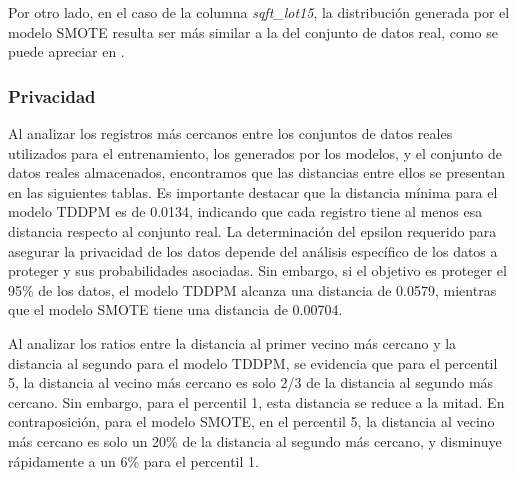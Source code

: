 

\newpage
Por otro lado, en el caso de la columna \emph{sqft\_lot15}, la distribución generada por el modelo SMOTE resulta ser más similar a la del conjunto de datos real, como se puede apreciar en .




\newpage
\subsubsection{Privacidad}
Al analizar los registros más cercanos entre los conjuntos de datos reales utilizados para el entrenamiento, los generados por los modelos, y el conjunto de datos reales almacenados, encontramos que las distancias entre ellos se presentan en las siguientes tablas. Es importante destacar que la distancia mínima para el modelo TDDPM es de 0.0134, indicando que cada registro tiene al menos esa distancia respecto al conjunto real. La determinación del epsilon requerido para asegurar la privacidad de los datos depende del análisis específico de los datos a proteger y sus probabilidades asociadas. Sin embargo, si el objetivo es proteger el 95\% de los datos, el modelo TDDPM alcanza una distancia de 0.0579, mientras que el modelo SMOTE tiene una distancia de 0.00704.





\newpage



\newpage
Al analizar los ratios entre la distancia al primer vecino más cercano y la distancia al segundo para el modelo TDDPM, se evidencia que para el percentil 5, la distancia al vecino más cercano es solo 2/3 de la distancia al segundo más cercano. Sin embargo, para el percentil 1, esta distancia se reduce a la mitad. En contraposición, para el modelo SMOTE, en el percentil 5, la distancia al vecino más cercano es solo un 20\% de la distancia al segundo más cercano, y disminuye rápidamente a un 6\% para el percentil 1.




\newpage
%
%
%


